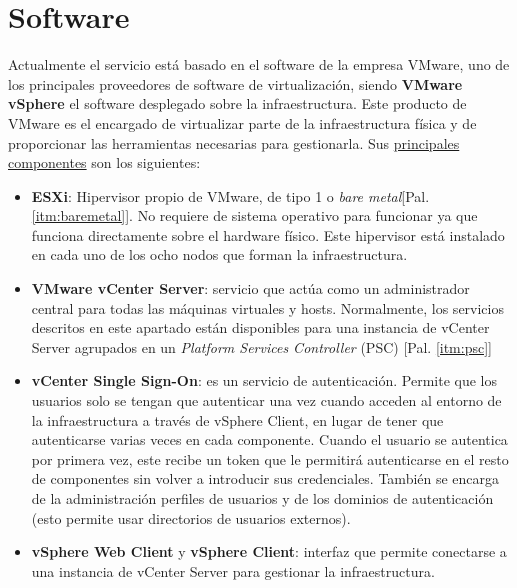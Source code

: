 \section{Software}
\label{subsec:softwareinstalado}
Actualmente el servicio está basado en el software de la empresa VMware, uno de los principales proveedores de software de virtualización, siendo \textbf{VMware vSphere} el software desplegado sobre la infraestructura. Este producto de VMware es el encargado de virtualizar parte de la infraestructura física y de proporcionar las herramientas necesarias para gestionarla. Sus \underline{principales componentes} son los siguientes:
\begin{itemize}
    
    \item \textbf{ESXi}: Hipervisor propio de VMware, de tipo 1 o \textit{bare metal}[Pal. \ref{itm:baremetal}]. No requiere de sistema operativo para funcionar ya que funciona directamente sobre el hardware físico\cite{Esxi}. Este hipervisor está instalado en cada uno de los ocho nodos que forman la infraestructura.
    
    \item \textbf{VMware vCenter Server}: servicio que actúa como un administrador central para todas las máquinas virtuales y hosts. Normalmente, los servicios descritos en este apartado están disponibles para una instancia de vCenter Server agrupados en un \textit{Platform Services Controller} (PSC) [Pal. \ref{itm:psc}]
    
    \item \textbf{vCenter Single Sign-On}: es un servicio de autenticación. Permite que los usuarios solo se tengan que autenticar una vez cuando acceden al entorno de la infraestructura a través de vSphere Client, en lugar de tener que autenticarse varias veces en cada componente. Cuando el usuario se autentica por primera vez, este recibe un token que le permitirá autenticarse en el resto de componentes sin volver a introducir sus credenciales. También se encarga de la administración perfiles de usuarios y de los dominios de autenticación (esto permite usar directorios de usuarios externos).\label{itm:singlesingonEX}
    

    \item \textbf{vSphere Web Client} y \textbf{vSphere Client}: interfaz que permite conectarse a una instancia de vCenter Server para gestionar la infraestructura.
    

\end{itemize}
